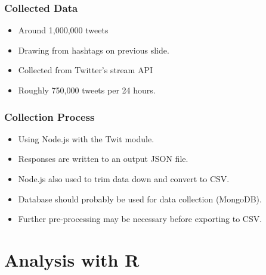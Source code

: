 \documentclass{beamer}
\begin{document}
\begin{frame}
	\frametitle{Collected Data}
	\begin{itemize}
    \item Around 1,000,000 tweets 
    \newline
    \item Drawing from hashtags on previous slide.
    \newline
    \item Collected from Twitter's stream API
    \newline
    \item Roughly 750,000 tweets per 24 hours.
    \newline
	\end{itemize}
\end{frame}

\begin{frame}
	\frametitle{Collection Process}
	\begin{itemize}
    \item Using Node.js with the Twit module.
    \newline
    \item Responses are written to an output JSON file.
    \newline
    \item Node.js also used to trim data down and convert to CSV.
    \newline
    \item Database should probably be used for data collection (MongoDB).
    \newline
    \item Further pre-processing may be necessary before exporting to CSV.
    \newline
	\end{itemize}
\end{frame}

\section{Analysis with R} %
\end{document}
